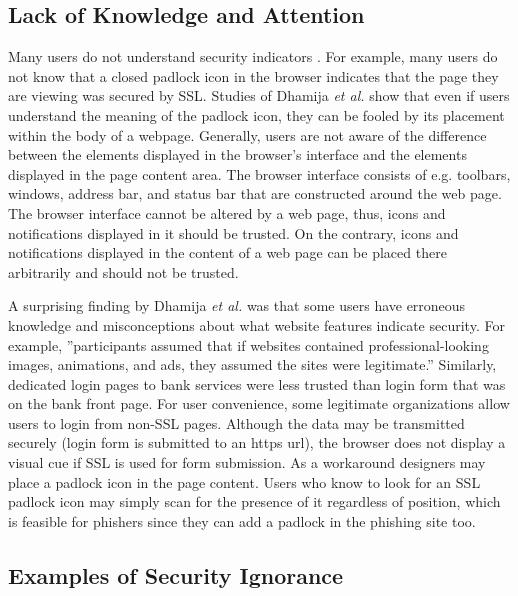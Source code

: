 \documentclass{tktltiki}
\begin{document}
          

      
    
\subsection{Lack of Knowledge and Attention}

    Many users do not understand security indicators \cite{why_phishing_works_06}. For example, many users do not know that a closed padlock icon in the browser indicates that the page they are viewing was secured by SSL. Studies of Dhamija \emph{et al.} \cite{why_phishing_works_06} show that even if users understand the meaning of the padlock icon, they can be fooled by its placement within the body of a webpage. Generally, users are not aware of the difference between the elements displayed in the browser's interface and the elements displayed in the page content area. The browser interface consists of e.g. toolbars, windows, address bar, and status bar that are constructed around the web page. The browser interface cannot be altered by a web page, thus, icons and notifications displayed in it should be trusted. On the contrary, icons and notifications displayed in the content of a web page can be placed there arbitrarily and should not be trusted.
        
        A surprising finding by Dhamija \emph{et al.} \cite{why_phishing_works_06}was that some users have erroneous knowledge and misconceptions about what website features indicate security. For example, ''participants assumed that if websites contained professional-looking images, animations, and ads, they assumed the sites were legitimate.'' Similarly, dedicated login pages to bank services were less trusted than login form that was on the bank front page. For user convenience, some legitimate organizations allow users to login from non-SSL pages. Although the data may be transmitted securely (login form is submitted to an https url), the browser does not display a visual cue if SSL is used for form submission. As a workaround designers may place a padlock icon in the page content. Users who know to look for an SSL padlock icon may simply scan for the presence of it regardless of position, which is feasible for phishers since they can add a padlock in the phishing site too.
        
    
\subsection{Examples of Security Ignorance}
\end{document}
